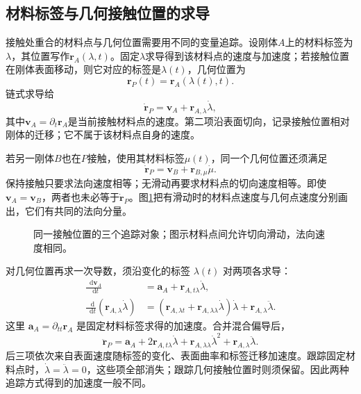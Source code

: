 \documentclass[11pt,openany,fontset=fandol]{ctexbook}
\theoremstyle{definition}\newtheorem{example}{例}[chapter]\newtheorem{exercise}{习题}[chapter]
\newcommand{\dd}{\mathop{}\!\mathrm d}\newcommand{\ee}{\mathrm e}\newcommand{\vct}[1]{\bm{#1}}
\begin{document}
\subsection{材料标签与几何接触位置的求导}
接触处重合的材料点与几何位置需要用不同的变量追踪。设刚体$A$上的材料标签为$\lambda$，其位置写作$\vct r_A(\lambda,t)$。固定$\lambda$求导得到该材料点的速度与加速度；若接触位置在刚体表面移动，则它对应的标签是$\lambda(t)$，几何位置为
\[\vct r_P(t)=\vct r_A(\lambda(t),t).
\]
链式求导给
\[\dot{\vct r}_P=\vct v_A+\vct r_{A,\lambda}\dot\lambda,
\]
其中$\vct v_A=\partial_t\vct r_A$是当前接触材料点的速度。第二项沿表面切向，记录接触位置相对刚体的迁移；它不属于该材料点自身的速度。

若另一刚体$B$也在$P$接触，使用其材料标签$\mu(t)$，同一个几何位置还须满足
\[\dot{\vct r}_P=\vct v_B+\vct r_{B,\mu}\dot\mu.
\]
保持接触只要求法向速度相等；无滑动再要求材料点的切向速度相等。即使$\vct v_A=\vct v_B$，两者也未必等于$\dot{\vct r}_P$。图\ref{mp2:fig:series-contact-label}把有滑动时的材料点速度与几何点速度分别画出，它们有共同的法向分量。

\begin{figure}[H]\centering
{}
\caption{同一接触位置的三个追踪对象；图示材料点间允许切向滑动，法向速度相同。}\label{mp2:fig:series-contact-label}
\end{figure}

对几何位置再求一次导数，须沿变化的标签 $\lambda(t)$ 对两项各求导：
\[
\begin{aligned}
\frac{\dd\vct v_A}{\dd t}
&=\vct a_A+\vct r_{A,t\lambda}\dot\lambda,\\
\frac{\dd}{\dd t}(\vct r_{A,\lambda}\dot\lambda)
&=(\vct r_{A,\lambda t}+\vct r_{A,\lambda\lambda}\dot\lambda)\dot\lambda
+\vct r_{A,\lambda}\ddot\lambda.
\end{aligned}
\]
这里 $\vct a_A=\partial_{tt}\vct r_A$ 是固定材料标签求得的加速度。合并混合偏导后，
\[\ddot{\vct r}_P=\vct a_A
+2\vct r_{A,t\lambda}\dot\lambda
+\vct r_{A,\lambda\lambda}\dot\lambda^2
+\vct r_{A,\lambda}\ddot\lambda.
\]
后三项依次来自表面速度随标签的变化、表面曲率和标签迁移加速度。跟踪固定材料点时，$\dot\lambda=\ddot\lambda=0$，这些项全部消失；跟踪几何接触位置时则须保留。因此两种追踪方式得到的加速度一般不同。
\end{document}
